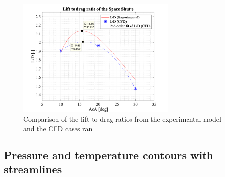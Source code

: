 \begin{figure}[H]
 \centering
 \includegraphics[width=0.7\textwidth]{matlab_images/L2D.png}
 \caption{Comparison of the lift-to-drag ratios from the experimental model and the CFD cases ran}
 \label{fig: l2d}
\end{figure}

\subsection{Pressure and temperature contours with streamlines}

